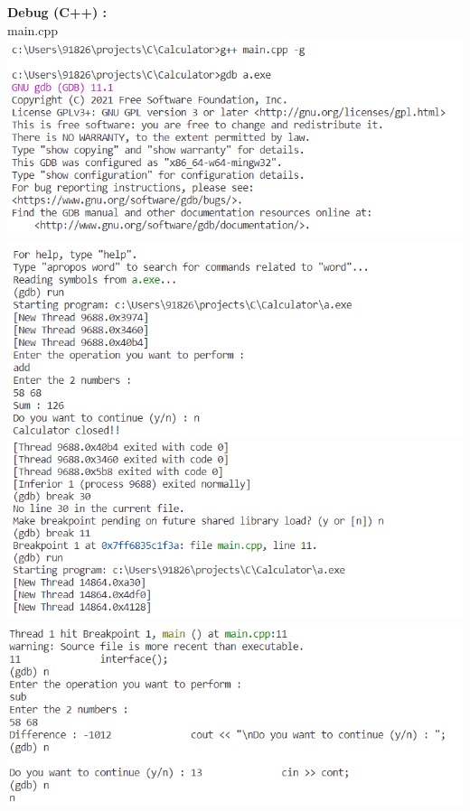 \documentclass{article}
\begin{document}
\textbf{\bf Debug (C++) : \\}
main.cpp\\
\includegraphics[scale=0.70]{cpp_debug_01}\\
\includegraphics[scale=0.70]{cpp_debug_02}\\
\includegraphics[scale=0.70]{cpp_debug_03}\\
\includegraphics[scale=0.70]{cpp_debug_04}\\
\end{document}
